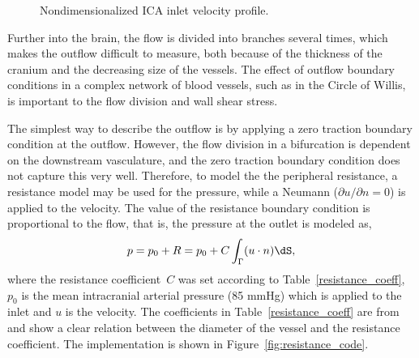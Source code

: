 \begin{figure}
  \begin{center}
  \end{center}
  \caption{Nondimensionalized ICA inlet velocity profile.}
  \label{fig:ford}
\end{figure}

Further into the brain, the flow is divided into branches several
times, which makes the outflow difficult to measure, both because of
the thickness of the cranium and the decreasing size of the vessels.
The effect of outflow boundary conditions in a complex network of
blood vessels, such as in the Circle of Willis, is important to the
flow division and wall shear stress.

The simplest way to describe the outflow is by applying a zero
traction boundary condition at the outflow. However, the flow division
in a bifurcation is dependent on the downstream vasculature, and the
zero traction boundary condition does not capture this very
well. Therefore, to model the the peripheral resistance, a resistance
model may be used for the pressure, while a Neumann (${\partial u /
  \partial n} = 0 $) is applied to the velocity. The value of the
resistance boundary condition is proportional to the flow, that is,
the pressure at the outlet is modeled as,
\begin{equation}
  p = p_0 + R = p_0 + C \int_\Gamma (u \cdot n) \dS,
\end{equation}
where the resistance coefficient~$C$ was set according to
Table~\ref{resistance_coeff}, $p_0$ is the mean intracranial arterial
pressure (85 mmHg) which is applied to the inlet and $u$ is the
velocity. The coefficients in Table~\ref{resistance_coeff} are
from~\cite{AlastrueyParkerPeiroEtAl2007} and show a clear relation between the diameter of
the vessel and the resistance coefficient. The implementation is shown
in Figure~\ref{fig:resistance_code}.

